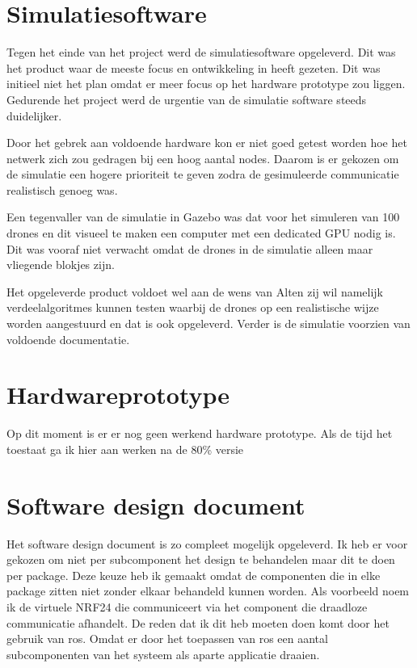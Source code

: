 \documentclass[a4paper, 11pt, oneside]{report}
\begin{document}
\section{Simulatiesoftware}\label{sec:simulatiesoftware}
Tegen het einde van het project werd de simulatiesoftware opgeleverd. 
Dit was het product waar de meeste focus en ontwikkeling in heeft gezeten.
Dit was initieel niet het plan omdat er meer focus op het hardware prototype zou liggen.
Gedurende het project werd de urgentie van de simulatie software steeds duidelijker.

Door het gebrek aan voldoende hardware kon er niet goed getest worden hoe het netwerk zich zou gedragen bij een hoog aantal nodes.
Daarom is er gekozen om de simulatie een hogere prioriteit te geven zodra de gesimuleerde communicatie realistisch genoeg was.

Een tegenvaller van de simulatie in Gazebo was dat voor het simuleren van 100 drones en dit visueel te maken een computer met een dedicated GPU nodig is. Dit was vooraf niet verwacht omdat de drones in de simulatie alleen maar vliegende blokjes zijn. 

Het opgeleverde product voldoet wel aan de wens van Alten zij wil namelijk verdeelalgoritmes kunnen testen waarbij de drones op een realistische wijze worden aangestuurd en dat is ook opgeleverd.  Verder is de simulatie voorzien van voldoende documentatie.  

\section{Hardwareprototype}\label{sec:hardwareprototype}

Op dit moment is er er nog geen werkend hardware prototype. Als de tijd het toestaat ga ik hier aan werken na de 80\% versie


\section{Software design document}\label{sec:software-design-document}
Het software design document is zo compleet mogelijk opgeleverd.
Ik heb er voor gekozen om niet per subcomponent het design te behandelen maar dit te doen per package.
Deze keuze heb ik gemaakt omdat de componenten die in elke package zitten niet zonder elkaar behandeld kunnen worden.
Als voorbeeld noem ik de virtuele NRF24 die communiceert via het component die draadloze communicatie afhandelt.
De reden dat ik dit heb moeten doen komt door het gebruik van ros.
Omdat er door het toepassen van ros een aantal subcomponenten van het systeem als aparte applicatie draaien.
\end{document}
